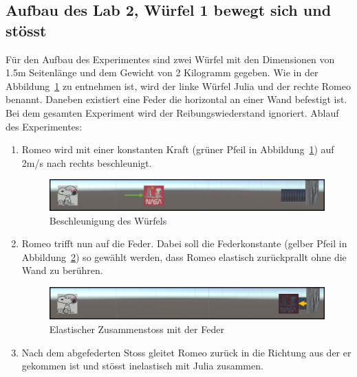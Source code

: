 \documentclass[../main.tex]{subfiles}
\begin{document}
    \subsection{Aufbau des Lab 2, \glqq Würfel 1 bewegt sich und stösst\grqq{}}
    Für den Aufbau des Experimentes sind zwei Würfel mit den Dimensionen von 1.5m Seitenlänge und dem Gewicht von 2
    Kilogramm gegeben.
    Wie in der Abbildung~\ref{fig:2Lab_2dPictureNr1} zu entnehmen ist, wird der linke Würfel Julia und der rechte Romeo benannt.
    Daneben existiert eine Feder die horizontal an einer Wand befestigt ist.
    Bei dem gesamten Experiment wird der Reibungswiederstand ignoriert. \newline
    Ablauf des Experimentes:
 \begin{enumerate}
     \item Romeo wird mit einer konstanten Kraft (grüner Pfeil in Abbildung~\ref{fig:2Lab_2dPictureNr1}) auf
     2m/s nach rechts beschleunigt.
     \begin{figure}[H]
                 \begin{center}
                     \centerline{\includegraphics[width=155mm]{./images/2Lab_2dPictureNr1.png}}
                     \caption{Beschleunigung des Würfels}
                     \label{fig:2Lab_2dPictureNr1}
                 \end{center}
     \end{figure}
     \item Romeo trifft nun auf die Feder. Dabei soll die Federkonstante (gelber Pfeil in Abbildung~\ref{fig:2Lab_2dPictureNr2})
     so gewählt werden, dass Romeo elastisch zurückprallt ohne die Wand zu berühren.
     \begin{figure}[H]
               \begin{center}
                   \centerline{\includegraphics[width=155mm]{./images/2Lab_2dPictureNr2.png}}
                   \caption{Elastischer Zusammenstoss mit der Feder}
                   \label{fig:2Lab_2dPictureNr2}
               \end{center}
     \end{figure}
     \item Nach dem abgefederten Stoss gleitet Romeo zurück in die Richtung aus der er gekommen ist und stösst inelastisch mit Julia zusammen.

\end{enumerate}
\end{document}
